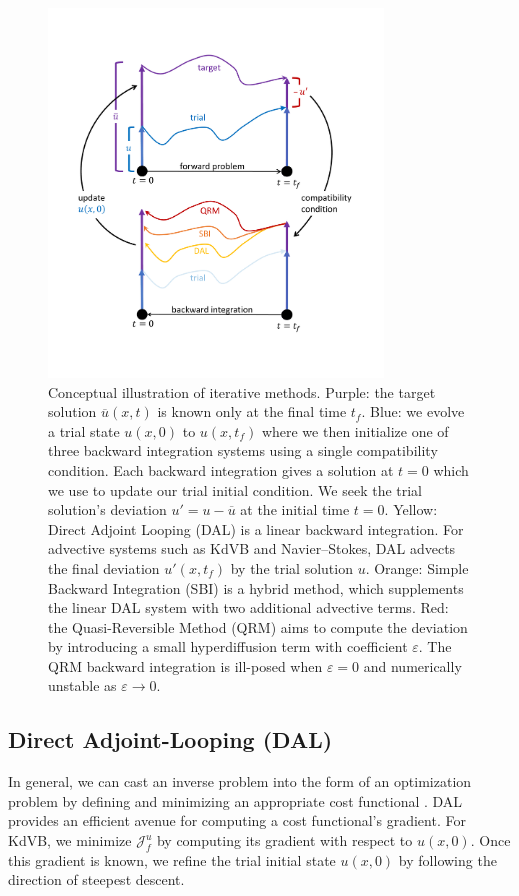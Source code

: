 \documentclass[%
 reprint,
 amsmath,amssymb,
 aps,
 pre,
]{revtex4-2}
\newcommand{\Juf}{\mathcal{J}^{u}_f}
\begin{document}
\begin{figure}
  \centering
  \includegraphics[width=3.5in]{loop.pdf}
  \caption{Conceptual illustration of iterative methods.
Purple: the target solution $\overline{u}(x, t)$ is known only at the final time $t_f$.
Blue: we evolve a trial state $u(x, 0)$ to $u(x, t_f)$ where we then initialize one of three backward integration systems using a single compatibility condition. 
Each backward integration gives a solution at $t=0$ which we use to update our trial initial condition. 
We seek the trial solution's deviation $u'=u-\overline{u}$ at the initial time $t=0$.
Yellow: Direct Adjoint Looping (DAL) is a linear backward integration.
For advective systems such as KdVB and Navier--Stokes, DAL advects the final deviation $u'(x,t_f)$ by the trial solution $u$. 
Orange: Simple Backward Integration (SBI) is a hybrid method, which supplements the linear DAL system with two additional advective terms.
Red: the Quasi-Reversible Method (QRM) aims to compute the deviation by introducing a small hyperdiffusion term with coefficient $\varepsilon$. 
The QRM backward integration is ill-posed when $\varepsilon=0$ and numerically unstable as $\varepsilon\to 0$.}
  \label{adj_diag}
\end{figure}

\subsection{Direct Adjoint-Looping (DAL)}\label{secDAL}
In general, we can cast an inverse problem into the form of an optimization problem by defining and minimizing an appropriate cost functional \cite{Steiner2012}.
DAL provides an efficient avenue for computing a cost functional's gradient.
For KdVB, we minimize $\Juf$ by computing its gradient with respect to $u(x,0)$.
Once this gradient is known, we refine the trial initial state $u(x,0)$ by following the direction of steepest descent.
\end{document}

